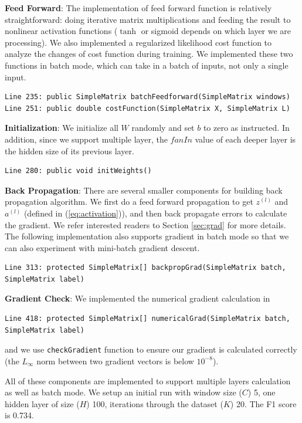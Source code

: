 \documentclass[letterpaper]{article}
\begin{document}
\textbf{Feed Forward}: The implementation of feed forward function is relatively straightforward: doing iterative matrix multiplications and feeding the result to  nonlinear activation functions ($\tanh$ or sigmoid depends on which layer we are processing). We also implemented a regularized likelihood cost function to analyze the changes of cost function during training.
We implemented these two functions in batch mode,
which can take in a batch of inputs, not only a single input.
\begin{verbatim}
Line 235: public SimpleMatrix batchFeedforward(SimpleMatrix windows)
Line 251: public double costFunction(SimpleMatrix X, SimpleMatrix L)
\end{verbatim}

\textbf{Initialization}: We initialize all $W$ randomly and set $b$ to zero as instructed. In addition, since we support multiple layer, the $fanIn$ value of each deeper layer is the hidden size of its previous layer.
\begin{verbatim}
Line 280: public void initWeights()
\end{verbatim}
\textbf{Back Propagation}: There are several smaller components for building back propagation algorithm.
We first do a feed forward propagation to get $z^{(l)}$ and $a^{(l)}$ (defined in (\ref{eq:activation})), and then back propagate errors to calculate the gradient. We refer interested readers to Section \ref{sec:grad} for more details. The following implementation also supports gradient in batch mode so that we can also experiment with mini-batch gradient descent.
\begin{verbatim}
Line 313: protected SimpleMatrix[] backpropGrad(SimpleMatrix batch, SimpleMatrix label)
\end{verbatim}

\textbf{Gradient Check}: 
We implemented the numerical gradient calculation in
\begin{verbatim}
Line 418: protected SimpleMatrix[] numericalGrad(SimpleMatrix batch, SimpleMatrix label)
\end{verbatim}
and we use \texttt{checkGradient} function to ensure our gradient is calculated correctly (the $L_\infty$ norm between two gradient vectors is below $10^{-8}$).

\vspace{0.1cm}

All of these components are implemented to support multiple layers calculation as well as batch mode. We setup an initial run with window size ($C$) 5, one hidden layer of size ($H$) 100, iterations through the dataset ($K$) 20. The F1 score is 0.734.
\end{document}
